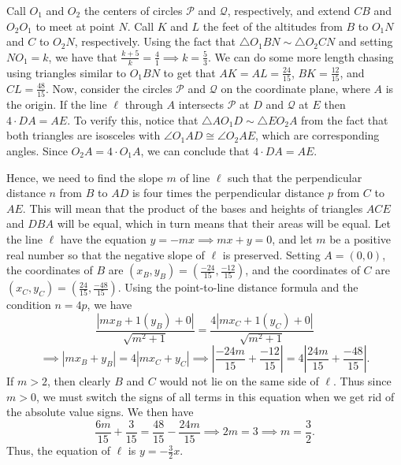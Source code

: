 \begin{enumerate}
 Call $O_1$ and $O_2$ the centers of circles $\mathcal{P}$ and  $\mathcal{Q}$, respectively, and extend $CB$ and $O_2O_1$ to meet at point $N$. Call $K$ and $L$ the feet of the altitudes from $B$ to $O_1N$ and $C$ to $O_2N$, respectively. Using the fact that $\triangle{O_1BN} \sim \triangle{O_2CN}$ and setting $NO_1 = k$, we have that $\frac{k+5}{k} = \frac{4}{1} \implies k=\frac{5}{3}$. We can do some more length chasing using triangles similar to $O_1BN$ to get that $AK = AL = \frac{24}{15}$, $BK = \frac{12}{15}$, and $CL = \frac{48}{15}$. Now, consider the circles $\mathcal{P}$ and $\mathcal{Q}$ on the coordinate plane, where $A$ is the origin. If the line $\ell$ through $A$ intersects $\mathcal{P}$ at $D$ and $\mathcal{Q}$ at $E$ then $4 \cdot DA = AE$. To verify this, notice that $\triangle{AO_1D} \sim \triangle{EO_2A}$ from the fact that both triangles are isosceles with $\angle{O_1AD} \cong \angle{O_2AE}$, which are corresponding angles. Since $O_2A = 4\cdot O_1A$, we can conclude that $4 \cdot DA = AE$.

 
Hence, we need to find the slope $m$ of line $\ell$ such that the perpendicular distance $n$ from $B$ to $AD$ is four times the perpendicular distance $p$ from $C$ to $AE$. This will mean that the product of the bases and heights of triangles $ACE$ and $DBA$ will be equal, which in turn means that their areas will be equal. Let the line $\ell$ have the equation $y = -mx \implies mx + y = 0$, and let $m$ be a positive real number so that the negative slope of $\ell$ is preserved. Setting $A = (0,0)$, the coordinates of $B$ are $(x_B, y_B) = \left(\frac{-24}{15}, \frac{-12}{15}\right)$, and the coordinates of $C$ are $(x_C, y_C) = \left(\frac{24}{15}, \frac{-48}{15}\right)$. Using the point-to-line distance formula and the condition $n = 4p$, we have 
 \[\frac{|mx_B + 1(y_B) + 0|}{\sqrt{m^2 + 1}} = \frac{4|mx_C + 1(y_C) + 0|}{\sqrt{m^2 + 1}}\] 
 \[\implies |mx_B + y_B| = 4|mx_C + y_C| \implies \left|\frac{-24m}{15} + \frac{-12}{15}\right| = 4\left|\frac{24m}{15} + \frac{-48}{15}\right|.\] If $m > 2$, then clearly $B$ and $C$ would not lie on the same side of $\ell$. Thus since $m > 0$, we must switch the signs of all terms in this equation when we get rid of the absolute value signs. We then have 
 \[\frac{6m}{15} + \frac{3}{15} = \frac{48}{15} - \frac{24m}{15} \implies 2m = 3 \implies m = \frac{3}{2}.\] Thus, the equation of $\ell$ is $y = -\frac{3}{2}x$.


\end{enumerate}
